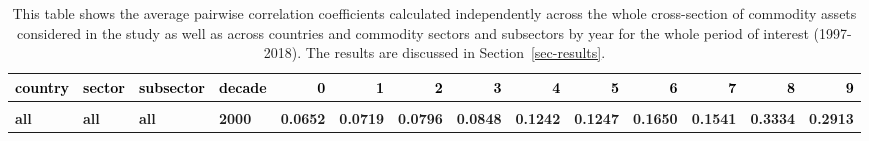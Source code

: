 \documentclass[
  authoryear,
  preprint,
  3p]{elsarticle}
\begin{document}
\begin{landscape}\begingroup\fontsize{7}{9}\selectfont

\begin{longtable}[t]{>{}l>{}l>{}l>{}l>{}r>{}r>{}r>{}r>{}r>{}r>{}r>{}r>{}r>{}r}

\caption{\label{tbl-correlations-years}This table shows the average
pairwise correlation coefficients calculated independently across the
whole cross-section of commodity assets considered in the study as well
as across countries and commodity sectors and subsectors by year for the
whole period of interest (1997-2018). The results are discussed in
Section~\ref{sec-results}.}

\tabularnewline

\toprule
\textcolor{black}{\textbf{country}} & \textcolor{black}{\textbf{sector}} & \textcolor{black}{\textbf{subsector}} & \textcolor{black}{\textbf{decade}} & \textcolor{black}{\textbf{0}} & \textcolor{black}{\textbf{1}} & \textcolor{black}{\textbf{2}} & \textcolor{black}{\textbf{3}} & \textcolor{black}{\textbf{4}} & \textcolor{black}{\textbf{5}} & \textcolor{black}{\textbf{6}} & \textcolor{black}{\textbf{7}} & \textcolor{black}{\textbf{8}} & \textcolor{black}{\textbf{9}}\\
\midrule
\textbf{\cellcolor{gray!10}{all}} & \textbf{\cellcolor{gray!10}{all}} & \textbf{\cellcolor{gray!10}{all}} & \textbf{\cellcolor{gray!10}{1990}} & \textcolor[HTML]{4285f4}{\textbf{\cellcolor{gray!10}{}}} & \textcolor[HTML]{4285f4}{\textbf{\cellcolor{gray!10}{}}} & \textcolor[HTML]{4285f4}{\textbf{\cellcolor{gray!10}{}}} & \textcolor[HTML]{4285f4}{\textbf{\cellcolor{gray!10}{}}} & \textcolor[HTML]{4285f4}{\textbf{\cellcolor{gray!10}{}}} & \textcolor[HTML]{4285f4}{\textbf{\cellcolor{gray!10}{}}} & \textcolor[HTML]{4285f4}{\textbf{\cellcolor{gray!10}{}}} & \textcolor[HTML]{4285f4}{\textbf{\cellcolor{gray!10}{0.0401}}} & \textcolor[HTML]{4285f4}{\textbf{\cellcolor{gray!10}{0.0812}}} & \textcolor[HTML]{4285f4}{\textbf{\cellcolor{gray!10}{0.0822}}}\\
\textbf{all} & \textbf{all} & \textbf{all} & \textbf{2000} & \textcolor[HTML]{4285f4}{\textbf{0.0652}} & \textcolor[HTML]{4285f4}{\textbf{0.0719}} & \textcolor[HTML]{4285f4}{\textbf{0.0796}} & \textcolor[HTML]{4285f4}{\textbf{0.0848}} & \textcolor[HTML]{4285f4}{\textbf{0.1242}} & \textcolor[HTML]{4285f4}{\textbf{0.1247}} & \textcolor[HTML]{4285f4}{\textbf{0.1650}} & \textcolor[HTML]{4285f4}{\textbf{0.1541}} & \textcolor[HTML]{4285f4}{\textbf{0.3334}} & \textcolor[HTML]{4285f4}{\textbf{0.2913}}\\

\end{longtable}
\end{landscape}
\end{document}
